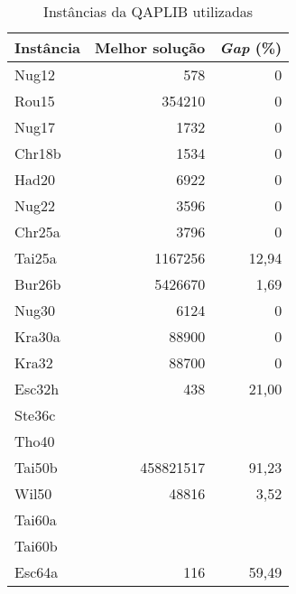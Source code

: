 \begin{table}[H]
  \caption{Instâncias da QAPLIB utilizadas\label{qapinst}}
  \centering
  \begin{tabular}{l r r}
    \toprule
    Instância & Melhor solução & \textit{Gap} (\%) \\
    \midrule
    Nug12 & 578 & 0 \\
    Rou15 & 354210 & 0 \\
    Nug17 & 1732 & 0 \\
    Chr18b & 1534 & 0 \\
    Had20 & 6922 & 0 \\
    Nug22 & 3596 & 0 \\
    Chr25a & 3796 & 0 \\
    Tai25a & 1167256 & 12,94 \\
    Bur26b & 5426670 & 1,69 \\
    Nug30 & 6124 & 0 \\
    Kra30a & 88900 & 0 \\
    Kra32  & 88700 & 0 \\
    Esc32h & 438 & 21,00 \\
    Ste36c & & \\
    Tho40 & & \\
    Tai50b & 458821517 & 91,23 \\
    Wil50 & 48816 & 3,52 \\
    Tai60a & & \\
    Tai60b & & \\
    Esc64a & 116 & 59,49 \\
    \bottomrule
  \end{tabular}
\end{table}
